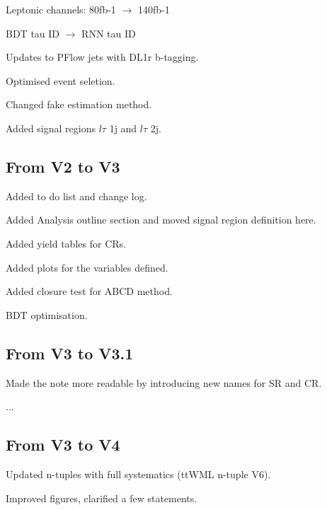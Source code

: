 Leptonic channels:  80fb-1 $\to$ 140fb-1

BDT tau ID $\to$ RNN tau ID

Updates to PFlow jets with DL1r b-tagging.

Optimised event seletion.

Changed fake estimation method.

Added signal regions $l\tau$ 1j and $l\tau$ 2j.

\subsection{From V2 to V3}

Added to do list and change log.

Added Analysis outline section and moved signal region definition here.

Added yield tables for CRs.

Added plots for the variables defined.

Added closure test for ABCD method.

BDT optimisation.

\subsection{From V3 to V3.1}

Made the note more readable by introducing new names for SR and CR.

...
\subsection{From V3 to V4}

Updated n-tuples with full systematics (ttWML n-tuple V6).

Improved figures, clarified a few statements.
